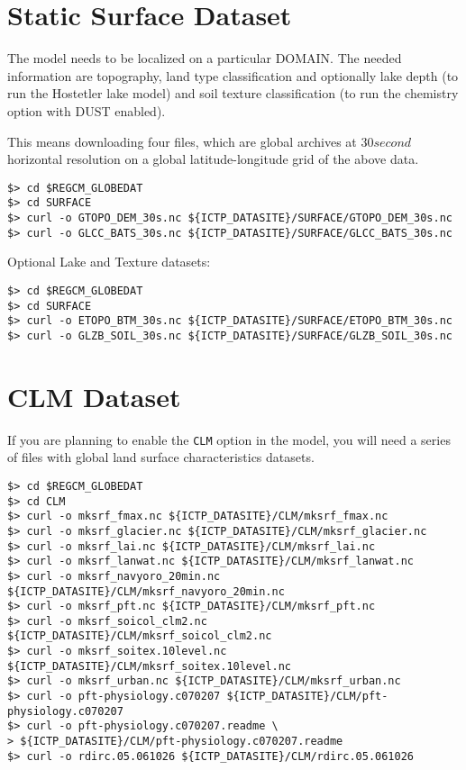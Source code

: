 \section{Static Surface Dataset}

The model needs to be localized on a particular DOMAIN. The needed information
are topography, land type classification and optionally lake depth (to run the
Hostetler lake model) and soil texture classification (to run the chemistry option
with DUST enabled).

This means downloading four files, which are global archives at $30 second$
horizontal resolution on a global latitude-longitude grid of the above data.

\begin{Verbatim}
$> cd $REGCM_GLOBEDAT
$> cd SURFACE
$> curl -o GTOPO_DEM_30s.nc ${ICTP_DATASITE}/SURFACE/GTOPO_DEM_30s.nc
$> curl -o GLCC_BATS_30s.nc ${ICTP_DATASITE}/SURFACE/GLCC_BATS_30s.nc
\end{Verbatim}

Optional Lake and Texture datasets:

\begin{Verbatim}
$> cd $REGCM_GLOBEDAT
$> cd SURFACE
$> curl -o ETOPO_BTM_30s.nc ${ICTP_DATASITE}/SURFACE/ETOPO_BTM_30s.nc
$> curl -o GLZB_SOIL_30s.nc ${ICTP_DATASITE}/SURFACE/GLZB_SOIL_30s.nc
\end{Verbatim}

\section{CLM Dataset}
\label{clmdata}

If you are planning to enable the \verb=CLM= option in the model, you will need
a series of files with global land surface characteristics datasets.

\begin{Verbatim}
$> cd $REGCM_GLOBEDAT
$> cd CLM
$> curl -o mksrf_fmax.nc ${ICTP_DATASITE}/CLM/mksrf_fmax.nc
$> curl -o mksrf_glacier.nc ${ICTP_DATASITE}/CLM/mksrf_glacier.nc
$> curl -o mksrf_lai.nc ${ICTP_DATASITE}/CLM/mksrf_lai.nc
$> curl -o mksrf_lanwat.nc ${ICTP_DATASITE}/CLM/mksrf_lanwat.nc
$> curl -o mksrf_navyoro_20min.nc ${ICTP_DATASITE}/CLM/mksrf_navyoro_20min.nc
$> curl -o mksrf_pft.nc ${ICTP_DATASITE}/CLM/mksrf_pft.nc
$> curl -o mksrf_soicol_clm2.nc ${ICTP_DATASITE}/CLM/mksrf_soicol_clm2.nc
$> curl -o mksrf_soitex.10level.nc ${ICTP_DATASITE}/CLM/mksrf_soitex.10level.nc
$> curl -o mksrf_urban.nc ${ICTP_DATASITE}/CLM/mksrf_urban.nc
$> curl -o pft-physiology.c070207 ${ICTP_DATASITE}/CLM/pft-physiology.c070207
$> curl -o pft-physiology.c070207.readme \
> ${ICTP_DATASITE}/CLM/pft-physiology.c070207.readme
$> curl -o rdirc.05.061026 ${ICTP_DATASITE}/CLM/rdirc.05.061026
\end{Verbatim}

